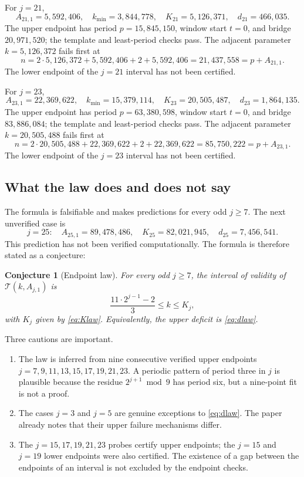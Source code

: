 \documentclass[11pt]{article}
\newtheorem{conjecture}[theorem]{Conjecture}
\theoremstyle{remark}
\begin{document}
For \(j=21\),
\[
A_{21,1}=5{,}592{,}406,\quad
k_{\min}=3{,}844{,}778,\quad
K_{21}=5{,}126{,}371,\quad
d_{21}=466{,}035.
\]
The upper endpoint has period \(p=15{,}845{,}150\), window start \(t=0\), and bridge \(20{,}971{,}520\); the template and least-period checks pass. The adjacent parameter \(k=5{,}126{,}372\) fails first at
\[
n=2\cdot5{,}126{,}372+5{,}592{,}406+2+5{,}592{,}406=21{,}437{,}558=p+A_{21,1}.
\]
The lower endpoint of the \(j=21\) interval has not been certified.

For \(j=23\),
\[
A_{23,1}=22{,}369{,}622,\quad
k_{\min}=15{,}379{,}114,\quad
K_{23}=20{,}505{,}487,\quad
d_{23}=1{,}864{,}135.
\]
The upper endpoint has period \(p=63{,}380{,}598\), window start \(t=0\), and bridge \(83{,}886{,}084\); the template and least-period checks pass. The adjacent parameter \(k=20{,}505{,}488\) fails first at
\[
n=2\cdot20{,}505{,}488+22{,}369{,}622+2+22{,}369{,}622=85{,}750{,}222=p+A_{23,1}.
\]
The lower endpoint of the \(j=23\) interval has not been certified.

\subsection{What the law does and does not say}

The formula is falsifiable and makes predictions for every odd \(j\ge7\). The next unverified case is
\[
j=25:\quad
A_{25,1}=89{,}478{,}486,\quad
K_{25}=82{,}021{,}945,\quad
d_{25}=7{,}456{,}541.
\]
This prediction has not been verified computationally. The formula is therefore stated as a conjecture:
\begin{conjecture}[Endpoint law]\label{conj:endpoint}
For every odd \(j\ge7\), the interval of validity of \(\mathcal T(k,A_{j,1})\) is
\[
\frac{11\cdot2^{j-1}-2}{3}\le k\le K_j,
\]
with \(K_j\) given by \eqref{eq:Klaw}. Equivalently, the upper deficit is \eqref{eq:dlaw}.
\end{conjecture}

Three cautions are important.
\begin{enumerate}[label=(\arabic*)]
\item The law is inferred from nine consecutive verified upper endpoints \(j=7,9,11,13,15,17,19,21,23\). A periodic pattern of period three in \(j\) is plausible because the residue \(2^{j+1}\bmod9\) has period six, but a nine-point fit is not a proof.
\item The cases \(j=3\) and \(j=5\) are genuine exceptions to \eqref{eq:dlaw}. The paper already notes that their upper failure mechanisms differ.
\item The \(j=15,17,19,21,23\) probes certify upper endpoints; the \(j=15\) and \(j=19\) lower endpoints were also certified. The existence of a gap between the endpoints of an interval is not excluded by the endpoint checks.
\end{enumerate}
\end{document}
